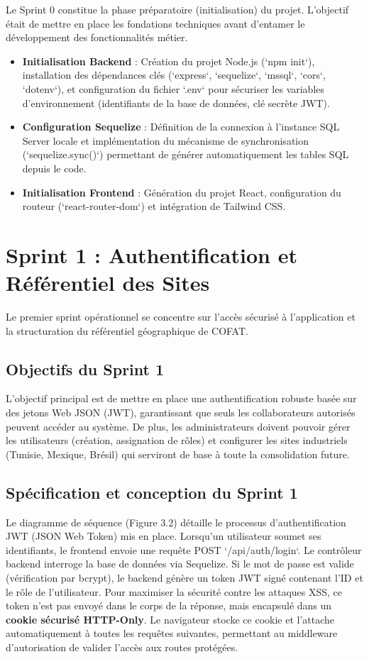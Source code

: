 Le Sprint 0 constitue la phase préparatoire (initialisation) du projet. L'objectif était de mettre en place les fondations techniques avant d'entamer le développement des fonctionnalités métier.
\begin{itemize}[label=\textbullet]
    \item \textbf{Initialisation Backend} : Création du projet Node.js (`npm init`), installation des dépendances clés (`express`, `sequelize`, `mssql`, `cors`, `dotenv`), et configuration du fichier `.env` pour sécuriser les variables d'environnement (identifiants de la base de données, clé secrète JWT).
    \item \textbf{Configuration Sequelize} : Définition de la connexion à l'instance SQL Server locale et implémentation du mécanisme de synchronisation (`sequelize.sync()`) permettant de générer automatiquement les tables SQL depuis le code.
    \item \textbf{Initialisation Frontend} : Génération du projet React, configuration du routeur (`react-router-dom`) et intégration de Tailwind CSS.
\end{itemize}

\section{Sprint 1 : Authentification et Référentiel des Sites} 

Le premier sprint opérationnel se concentre sur l'accès sécurisé à l'application et la structuration du référentiel géographique de COFAT.

\subsection{Objectifs du Sprint 1}

L'objectif principal est de mettre en place une authentification robuste basée sur des jetons Web JSON (JWT), garantissant que seuls les collaborateurs autorisés peuvent accéder au système. De plus, les administrateurs doivent pouvoir gérer les utilisateurs (création, assignation de rôles) et configurer les sites industriels (Tunisie, Mexique, Brésil) qui serviront de base à toute la consolidation future.

\subsection{Spécification et conception du Sprint 1}

Le diagramme de séquence (Figure 3.2) détaille le processus d'authentification JWT (JSON Web Token) mis en place.
Lorsqu'un utilisateur soumet ses identifiants, le frontend envoie une requête POST `/api/auth/login`. Le contrôleur backend interroge la base de données via Sequelize. Si le mot de passe est valide (vérification par bcrypt), le backend génère un token JWT signé contenant l'ID et le rôle de l'utilisateur.
Pour maximiser la sécurité contre les attaques XSS, ce token n'est pas envoyé dans le corps de la réponse, mais encapsulé dans un \textbf{cookie sécurisé HTTP-Only}. Le navigateur stocke ce cookie et l'attache automatiquement à toutes les requêtes suivantes, permettant au middleware d'autorisation de valider l'accès aux routes protégées.

